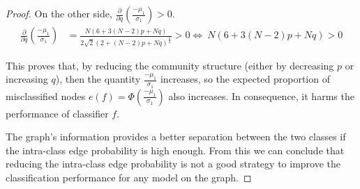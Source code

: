 \begin{proof}
	On the other side, $\frac{\partial}{\partial q}\left(\frac{-\mu_1}{\sigma_1} \right) > 0$. 
	\begin{align*}
		\frac{\partial}{\partial q}\left(\frac{-\mu_1}{\sigma_1} \right) &=
		\frac{N(6 + 3(N-2)p + Nq)}{2\sqrt{2}(2 + (N-2)p + Nq)^{\frac{3}{2}}} > 0
		\Longleftrightarrow\ N(6 + 3(N-2)p + Nq) > 0 
	\end{align*}
	
	This proves that, by reducing the community structure (either by decreasing $p$ or increasing $q$), then the quantity $\frac{-\mu_1}{\sigma_1}$ increases, so the expected proportion of misclassified nodes $e(f) = \Phi\left(\frac{-\mu_1}{\sigma_1}\right)$ also increases. In consequence, it harms the performance of classifier $f$.

The graph's information provides a better separation between the two classes if the intra-class edge probability is high enough. From this we can conclude that reducing the intra-class edge probability is not a good strategy to improve the classification performance for any model on the graph.
\end{proof}


